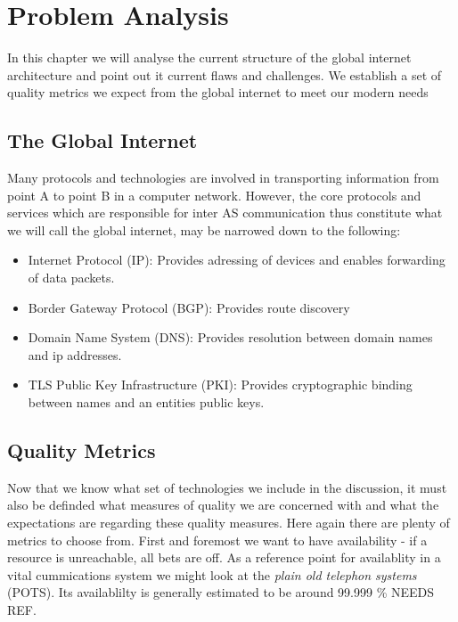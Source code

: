 \documentclass[../eva1_scion.tex]{subfiles}
\begin{document}
\chapter{Problem Analysis}\label{ch:analysis}

In this chapter we will analyse the current structure of the global internet architecture and point out it current flaws and challenges. We establish a set of quality metrics we expect from the global internet to meet our modern needs

\section{The Global Internet}%
\label{sec:the_global_internet}

Many protocols and technologies are involved in transporting information from point A to point B in a computer network. However, the core protocols and services which are responsible for inter AS  communication thus constitute what we will call the global internet, may be narrowed down to the following:

\begin{itemize}
    \item Internet Protocol (IP): Provides adressing of devices and enables forwarding of data packets.
    \item Border Gateway Protocol (BGP): Provides route discovery \cite{rfc_bgp}
    \item Domain Name System (DNS): Provides resolution between domain names and ip addresses.
    \item TLS Public Key Infrastructure (PKI): Provides cryptographic binding between names and an entities public keys.
\end{itemize}

\section{Quality Metrics}%
\label{sec:quality_metrics}

Now that we know what set of technologies we include in the discussion, it must also be definded what measures of quality we are concerned with and what the expectations are regarding these quality measures. Here again there are plenty of metrics to choose from. First and foremost we want to have availability - if a resource is unreachable, all bets are off. As a reference point for availablity in a vital cummications system we might look at the \textit{plain old telephon systems} (POTS). Its availablilty is generally estimated to be around 99.999 \% NEEDS REF.
\end{document}
